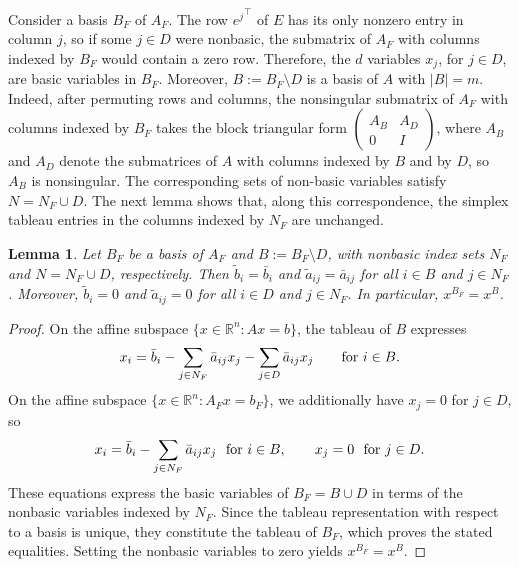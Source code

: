 \documentclass{article}
\newtheorem{lemma}{Lemma}
\newcommand{\R}{\mathbb{R}}
\begin{document}
Consider a basis $B_F$ of $A_F$. The row ${e^j}^\top$ of $E$ has its only nonzero entry in column $j$, so if some $j \in D$ were nonbasic, the submatrix of $A_F$ with columns indexed by $B_F$ would contain a zero row. Therefore, the $d$ variables $x_j$, for $j \in D$, are basic variables in $B_F$. Moreover, $B := B_F \setminus D$ is a basis of $A$ with $|B| = m$. Indeed, after permuting rows and columns, the nonsingular submatrix of $A_F$ with columns indexed by $B_F$ takes the block triangular form $\begin{pmatrix} A_B & A_D \\ 0 & I \end{pmatrix}$, where $A_B$ and $A_D$ denote the submatrices of $A$ with columns indexed by $B$ and by $D$, so $A_B$ is nonsingular. The corresponding sets of non-basic variables satisfy $N = N_F \cup D$. The next lemma shows that, along this correspondence, the simplex tableau entries in the columns indexed by $N_F$ are unchanged.

\begin{lemma} \label{lemma:basis-correspondence}
    Let $B_F$ be a basis of $A_F$ and $B := B_F \setminus D$, with nonbasic index sets $N_F$ and $N = N_F \cup D$, respectively. Then $\tilde b_i = \bar b_i$ and $\tilde a_{ij} = \bar a_{ij}$ for all $i \in B$ and $j \in N_F$. Moreover, $\tilde b_i = 0$ and $\tilde a_{ij} = 0$ for all $i \in D$ and $j \in N_F$. In particular, $x^{B_F} = x^B$.
\end{lemma}

\begin{proof}
    On the affine subspace $\{x \in \R^n : Ax = b\}$, the tableau of $B$ expresses
    \begin{align}
        x_i = \bar b_i - \sum_{j \in N_F} \bar a_{ij} x_j - \sum_{j \in D} \bar a_{ij} x_j \qquad \text{for } i \in B. \notag
    \end{align}
    On the affine subspace $\{x \in \R^n : A_F x = b_F\}$, we additionally have $x_j = 0$ for $j \in D$, so
    \begin{align}
        x_i = \bar b_i - \sum_{j \in N_F} \bar a_{ij} x_j \ \text{ for } i \in B, \qquad x_j = 0 \ \text{ for } j \in D. \notag
    \end{align}
    These equations express the basic variables of $B_F = B \cup D$ in terms of the nonbasic variables indexed by $N_F$. Since the tableau representation with respect to a basis is unique, they constitute the tableau of $B_F$, which proves the stated equalities. Setting the nonbasic variables to zero yields $x^{B_F} = x^B$.
\end{proof}
\end{document}
